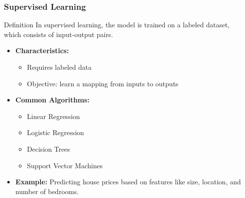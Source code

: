 \documentclass[aspectratio=169]{beamer}
\begin{document}
\begin{frame}[fragile]
    \frametitle{Supervised Learning}
    \begin{block}{Definition}
        In supervised learning, the model is trained on a labeled dataset, which consists of input-output pairs. 
    \end{block}

    \begin{itemize}
        \item \textbf{Characteristics:}
        \begin{itemize}
            \item Requires labeled data
            \item Objective: learn a mapping from inputs to outputs
        \end{itemize}

        \item \textbf{Common Algorithms:}
        \begin{itemize}
            \item Linear Regression
            \item Logistic Regression
            \item Decision Trees
            \item Support Vector Machines
        \end{itemize}

        \item \textbf{Example:}
        Predicting house prices based on features like size, location, and number of bedrooms.
    \end{itemize}
\end{frame}
\end{document}
